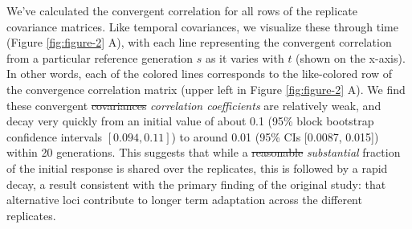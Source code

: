 \documentclass[11pt]{article}
\newcommand{\vb}[1]{{\it \color{blue} #1}}
\providecommand{\DIFdeltex}[1]{{\protect\color{red}\sout{#1}}}                      %
\providecommand{\DIFaddbegin}{} %
\providecommand{\DIFaddend}{} %
\providecommand{\DIFdelbegin}{} %
\providecommand{\DIFdelend}{} %
\providecommand{\DIFdel}[1]{\texorpdfstring{\DIFdeltex{#1}}{}} %
\begin{document}
We've calculated the convergent correlation for all rows of the replicate
covariance matrices. Like temporal covariances, we visualize these through time
(Figure \ref{fig:figure-2} A), with each line representing the convergent
correlation from a particular reference generation $s$ as it varies with $t$
(shown on the x-axis). In other words, each of the colored lines corresponds to
the like-colored row of the convergence correlation matrix (upper left in
Figure \ref{fig:figure-2} A). We find these convergent \DIFdelbegin \DIFdel{covariances }\DIFdelend \DIFaddbegin \vb{correlation
coefficients} \DIFaddend are relatively weak, and decay very quickly from an initial value
of about 0.1 (95\% block bootstrap confidence intervals $[0.094, 0.11]$) to
around 0.01 (95\% CIs [0.0087, 0.015]) within 20 generations. This suggests
that while a \DIFdelbegin \DIFdel{reasonable }\DIFdelend \DIFaddbegin \vb{substantial} \DIFaddend fraction of the initial response is shared over
the replicates, this is followed by a rapid decay, a result consistent with the
primary finding of the original \textcite{Barghi2019-qy} study: that
alternative loci contribute to longer term adaptation across the different
replicates. 
\end{document}

